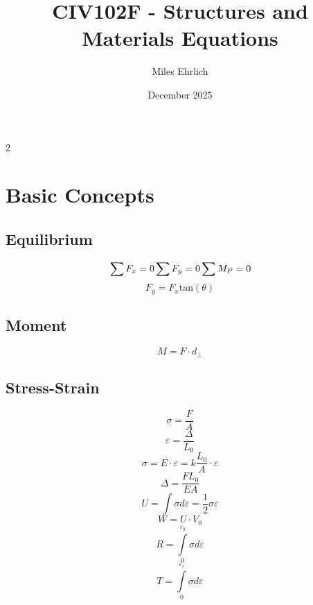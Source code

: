 \documentclass[14pt]{article}
\title{CIV102F - Structures and Materials Equations}
\author{Miles Ehrlich}
\date{December 2025}
\begin{document}
\maketitle
\begin{multicols}{2}

    \section{Basic Concepts}
    \subsection{Equilibrium}
    
    \begin{equation}
        \\ \sum F_x=0 \quad
        \\ \sum F_y=0 \quad
        \\ \sum M_P=0
    \end{equation}
    \begin{equation}
        F_y=F_x \text{tan}(\theta)
    \end{equation}

    \subsection{Moment}
    \begin{equation}
        M=F\cdot d_{\perp}
    \end{equation}
    \subsection{Stress-Strain}
    \begin{equation}
        \sigma = \frac{F}{A}
    \end{equation}
    \begin{equation}
        \varepsilon=\frac{\Delta}{L_0}
    \end{equation}
    \begin{equation}
        \sigma=E\cdot \varepsilon=k\frac{L_0}{A}\cdot \varepsilon
    \end{equation}
    \begin{equation}
        \Delta=\frac{FL_0}{EA}
    \end{equation}
    \begin{equation}
        U=\int \sigma d\varepsilon=\frac{1}{2}\sigma \varepsilon
    \end{equation}
    \begin{equation}
        W=U\cdot V_0
    \end{equation}
    \begin{equation}
        R=\int \limits_{0}^{\varepsilon_y} \sigma d\varepsilon
    \end{equation}
    \begin{equation}
        T=\int \limits_{0}^{\varepsilon_r} \sigma d\varepsilon
    \end{equation}

\end{multicols}
\end{document}
